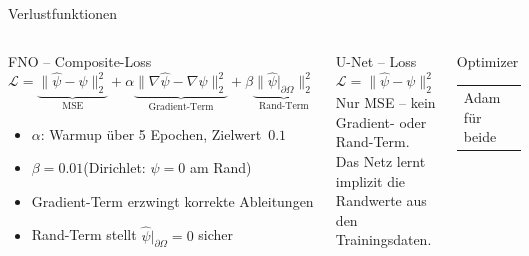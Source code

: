 \documentclass[aspectratio=169]{beamer}
\begin{document}
\begin{frame}{Verlustfunktionen}
  \begin{columns}[T]
      \begin{block}{FNO -- Composite-Loss}
        \[
          \mathcal{L} =
            \underbrace{\|\hat\psi - \psi\|_2^2}_{\text{MSE}}
          + \alpha\underbrace{\|\nabla\hat\psi - \nabla\psi\|_2^2}_{\text{Gradient-Term}}
          + \beta\underbrace{\|\hat\psi\big|_{\partial\Omega}\|_2^2}_{\text{Rand-Term}}
        \]
        \begin{itemize}
          \item $\alpha$: Warmup über 5 Epochen, Zielwert~$0.1$
          \item $\beta = 0.01$\quad (Dirichlet: $\psi = 0$ am Rand)
          \item Gradient-Term erzwingt korrekte Ableitungen
          \item Rand-Term stellt $\hat\psi\big|_{\partial\Omega} = 0$ sicher
        \end{itemize}
      \end{block}

      \begin{block}{U-Net -- Loss}
        \[
          \mathcal{L} = \|\hat\psi - \psi\|_2^2
        \]
        Nur MSE -- kein Gradient- oder Rand-Term.\\[6pt]
        Das Netz lernt implizit die Randwerte aus den Trainingsdaten.
      \end{block}

      \vspace{8pt}
      \begin{block}{Optimizer}
        \begin{tabular}{ll}
         Adam für beide
        \end{tabular}
      \end{block}
  \end{columns}
\end{frame}
\end{document}
